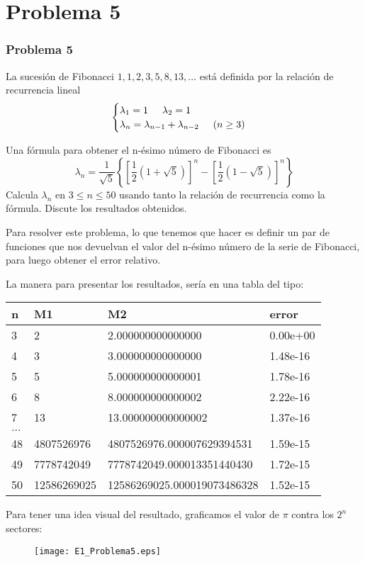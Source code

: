 \section{Problema 5}
\begin{frame}
\frametitle{Problema 5}
La sucesi\'{o}n de Fibonacci $1,1,2,3,5,8,13,\ldots$ est\'{a} definida por la relaci\'{o}n de recurrencia lineal
\begin{equation*}
\begin{cases}
\lambda_{1} = 1 \hspace{0.5cm} \lambda_{2}= 1 \\
\lambda_{n} = \lambda_{n-1} + \lambda_{n-2} \hspace{0.5cm} (n \geq 3)
\end{cases}
\end{equation*}
\end{frame}
\begin{frame}
Una f\'{o}rmula para obtener el n-\'{e}simo n\'{u}mero de Fibonacci es
\[ \lambda_{n} = \dfrac{1}{\sqrt{5}} \left\lbrace \left[ \dfrac{1}{2} (1 + \sqrt{5}) \right]^{n} - \left[ \dfrac{1}{2} (1 - \sqrt{5}) \right]^{n} \right\rbrace \]
Calcula $\lambda_{n}$ en $3\leq n \leq 50$ usando tanto la relaci\'{o}n de recurrencia como la f\'{o}rmula. Discute los resultados obtenidos.
\end{frame}
\begin{frame}
Para resolver este problema, lo que tenemos que hacer es definir un par de funciones que nos devuelvan el valor del n-\'{e}simo n\'{u}mero de la serie de Fibonacci, para luego obtener el error relativo.
\end{frame}
\begin{frame}
La manera para presentar los resultados, ser\'{i}a en una tabla del tipo:
\fontsize{12}{12}\selectfont
\begin{center}
	\begin{tabular}{l | l | l | l}
	n & M1 & M2 & error \\ \hline
	3 & 2 & 2.000000000000000 & 0.00e+00 \\ \hline
	4 & 3 & 3.000000000000000 & 1.48e-16 \\ \hline
	5 & 5 & 5.000000000000001 & 1.78e-16 \\ \hline
	6 & 8 & 8.000000000000002 & 2.22e-16 \\ \hline
	7 & 13 & 13.000000000000002 & 1.37e-16 \\ \hline
 	$\ldots$ & & &   \\ \hline
 	48 & 4807526976 & 4807526976.000007629394531 & 1.59e-15 \\ \hline
	49 & 7778742049 & 7778742049.000013351440430 & 1.72e-15 \\ \hline
	50 & 12586269025 & 12586269025.000019073486328 & 1.52e-15
	\end{tabular}
\end{center}
\end{frame}
\begin{frame}
Para tener una idea visual del resultado, graficamos el valor de $\pi$ contra los $2^{n}$ sectores:
\begin{figure}
	\centering
	\texttt{[image: E1\_Problema5.eps]} 
\end{figure}
\end{frame}
